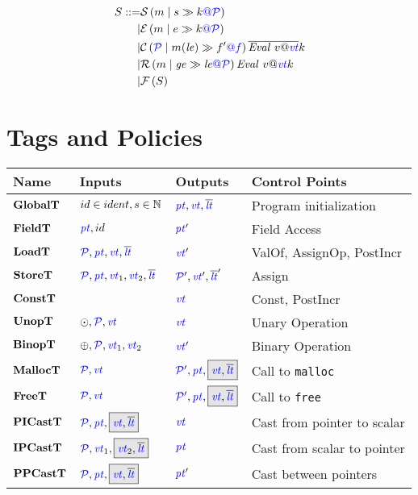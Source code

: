 \documentclass{llncs}
\begin{document}
\[\begin{aligned}
S ::= & \sstate{\PCT}{\mem}{\stmt}{\cont} \\
| & \estate{\PCT}{\mem}{\expr}{\cont} \\
| & \cstate{f}{\PCT}{\mem}{\lenv}{f'}{\overline{\val{v}{\vt}}}{\cont} \\
| & \rstate{\PCT}{\mem}{\genv}{\lenv}{\val{v}{\vt}}{\cont} \\
| & \fstate{S} \\
\end{aligned}\]

\section{Tags and Policies}
\label{sec:policies}

\begin{table}
  \begin{tabular}{|l|l|l|l|}
    \hline
    Name & Inputs & Outputs & Control Points \\
    \hline
    \(\globaltname\)    & \(\globaltargstyped\)  & \(\globaltres\)    & Program initialization \\
    \(\fieldtname\)     & \(\fieldtargs\)        & \(\fieldtres\)     & Field Access \\
    \(\loadtname\)      & \(\loadtargs\)         & \(\loadtres\)      & ValOf, AssignOp, PostIncr \\
    \(\storetname\)     & \(\storetargs\)        & \(\storetres\)     & Assign \\
    \(\consttname\)     &                        & \(\consttres\)     & Const, PostIncr \\
    \(\unoptname\)      & \(\unoptargs\)         & \(\unoptres\)      & Unary Operation \\
    \(\binoptname\)     & \(\binoptargs\)        & \(\binoptres\)     & Binary Operation \\
    \(\malloctname\)    & \(\malloctargs\)       & \(\malloctres\)    & Call to {\tt malloc} \\
    \(\freetname\)      & \(\freetargs\)         & \(\freetres\)      & Call to {\tt free} \\
    \(\picasttname\)    & \(\picasttargs\)       & \(\picasttres\)    & Cast from pointer to scalar \\
    \(\ipcasttname\)    & \(\ipcasttargs\)       & \(\ipcasttres\)    & Cast from scalar to pointer \\
    \(\ppcasttname\)    & \(\ppcasttargs\)       & \(\ppcasttres\)    & Cast between pointers \\

\end{tabular}
\end{table}
\end{document}
